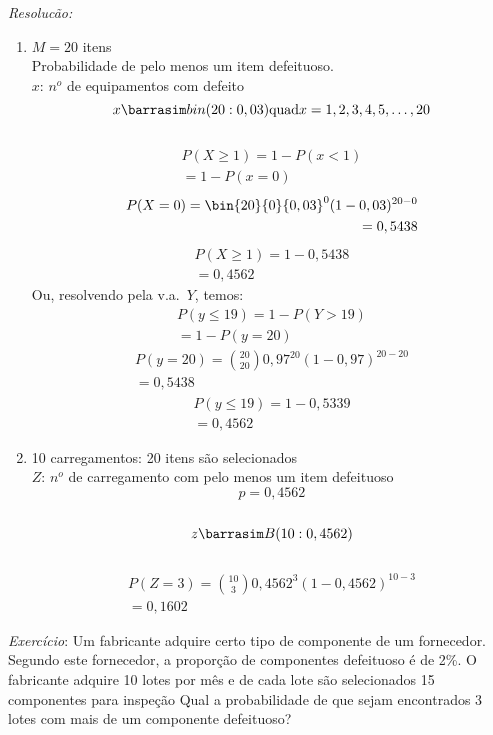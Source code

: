 \documentclass[11pt,a4paper]{book}
\begin{document}
\begin{enumerate}[label=(\alph*)]
\begin{enumerate}
\emph{Resolucão:}
\begin{enumerate}[label=(\alph*)]
  \item    $M=20$ itens\\
    Probabilidade de pelo menos um item defeituoso.\\
    $x$: $n^o$ de equipamentos com defeito\\
    $$x \barrasim bin(20:0,03) \text{quad} x=1,2,3,4,5,\dots,20$$\\
    \begin{align*}
      P(X\ge 1)= 1-P(x<1)\\
      =1-P(x=0)
    \end{align*}
    \begin{align*}
      P(X=0)= \bin{20}{0} {0,03}^0 (1-0,03)^{20-0}\\
      =0,5438
    \end{align*}
    \begin{align*}
      P(X\ge 1)= 1-0,5438\\
      =0,4562
    \end{align*}
    Ou, resolvendo pela v.a.\ $Y$, temos:
    \begin{align*}
      P(y\le 19)=1-P(Y>19)\\
      =1-P(y=20)
    \end{align*}
    \begin{align*}
      P(y=20)=\binom{20}{20}0,97^{20}(1-0,97)^{20-20}\\
      =0,5438
    \end{align*}
    \begin{align*}
      P(y\le 19)=1-0,5339\\
      =0,4562
    \end{align*}
  \item 10 carregamentos: 20 itens são selecionados \\
    $Z$: $n^o$ de carregamento com pelo menos um item defeituoso \\
    $$p=0,4562$$\\
    $$z \barrasim B(10:0,4562)$$\\
    \begin{align*}
      P(Z=3)=\binom{10}{3}0,4562^3 (1-0,4562)^{10-3}\\
      =0,1602
    \end{align*}
\end{enumerate}

\emph{Exercício}: Um fabricante adquire certo tipo de componente de um fornecedor.
Segundo este fornecedor, a proporção de componentes defeituoso é de 2\%. O fabricante
adquire 10 lotes por mês e de cada lote são selecionados 15 componentes para 
inspeção Qual a probabilidade de que sejam encontrados 3 lotes com mais de um 
componente defeituoso?


\end{enumerate}
\end{enumerate}
\end{document}
